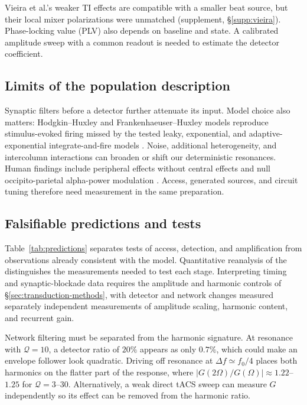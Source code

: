 \documentclass[11pt,a4paper]{article}
\providecommand{\DIFaddtex}[1]{{\protect\color{blue} \sf #1}} %
\providecommand{\DIFdeltex}[1]{{\protect\color{red} \scriptsize #1}} %
\providecommand{\DIFaddbegin}{} %
\providecommand{\DIFaddend}{} %
\providecommand{\DIFdelbegin}{} %
\providecommand{\DIFdelend}{} %
\providecommand{\DIFadd}[1]{\texorpdfstring{\DIFaddtex{#1}}{#1}} %
\providecommand{\DIFdel}[1]{\texorpdfstring{\DIFdeltex{#1}}{}} %
\begin{document}
Vieira et al.'s weaker TI effects \cite{vieira2024} are compatible with a
smaller beat source, but their local mixer polarizations were unmatched
(supplement, \S\ref{supp:vieira}). Phase-locking value (PLV) also depends on
baseline and state. A calibrated amplitude sweep with a common readout is
needed to estimate the detector coefficient.

\subsection{Limits of the population description}
Synaptic filters before a detector further attenuate its input. Model choice
also matters: Hodgkin--Huxley and Frankenhaeuser--Huxley models reproduce
stimulus-evoked firing missed by the tested leaky, exponential, and
adaptive-exponential integrate-and-fire models \cite{plovie2025}.
Noise, additional heterogeneity, and intercolumn interactions can broaden or
shift our deterministic resonances. Human findings include peripheral effects
without central effects \cite{iszak2023} and null occipito-parietal alpha-power
modulation \cite{mansourinezhad2025}. Access, generated sources, and circuit
tuning therefore need measurement in the same preparation.

\subsection{Falsifiable predictions and tests}\label{sec:predictions}
Table~\ref{tab:predictions} \DIFdelbegin \DIFdel{separates tests of access, detection, and amplification
from observations already consistent with the model. Quantitative reanalysis of
the }\DIFdelend \DIFaddbegin \DIFadd{distinguishes the measurements needed to test each
stage. Interpreting }\DIFaddend timing and synaptic-blockade data requires \DIFdelbegin \DIFdel{the amplitude and harmonic controls
of \S\ref{sec:transduction-methods}, with detector and network changes measured
separately}\DIFdelend \DIFaddbegin \DIFadd{independent
measurements of amplitude scaling, harmonic content, and recurrent gain}\DIFaddend .

Network filtering must be separated from the harmonic signature. At resonance
with $\mathcal Q=10$, a detector ratio of $20\%$ appears as only $0.7\%$,
which could make an envelope follower look quadratic. Driving off resonance
at $\Delta f\simeq f_0/4$ places both harmonics on the flatter part of the
response, where $|G(2\Omega)/G(\Omega)|\approx1.22$--$1.25$ for
$\mathcal Q=3$--$30$. Alternatively, a weak direct tACS sweep can measure
$G$ independently so its effect can be removed from the harmonic ratio.
\end{document}
